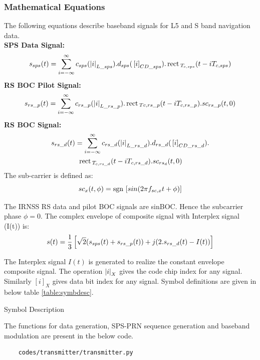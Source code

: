 \subsubsection{Mathematical Equations}
The following equations describe baseband signals for L5 and S band navigation data.
\\
\textbf{SPS Data Signal:}
\begin{equation}
	s_{sps}(t) = \sum_{i=-\infty}^{\infty} c_{sps}(\left\vert i\right\vert_{L\_sps}) . d_{sps}({}\left[i\right]_{CD\_sps}) . \,\text{rect}\,_{T_{c,sps}}(t-iT_{c,sps})
\end{equation}
\textbf{RS BOC Pilot Signal:}
\begin{equation}
	s_{rs\_p}(t) = \sum_{i=-\infty}^{\infty} c_{rs\_p}(\left\vert i\right\vert_{L\_rs\_p}) . \,\text{rect}\,_{Tc,rs\_p}(t-iT_{c,rs\_p}). sc_{rs\_p}(t,0)
\end{equation}
\textbf{RS BOC Signal:}
\begin{multline}
	s_{rs\_d}(t) = \sum_{i=-\infty}^{\infty} c_{rs\_d}(\left\vert i\right\vert_{L\_rs\_d}) . d_{rs\_d}({}\left[i\right]_{CD\_rs\_d}).  \\ 
	                       \,\text{rect}\,_{T_{c,rs\_d}}(t-iT_{c,rs\_d}). sc_{rs_d}(t,0)
\end{multline}
The sub-carrier is defined as:
\begin{equation}
	sc_x(t,\phi) = \mathop{\mathrm{sgn}}{}\left[sin(2 \pi f_{sc,x}t + \phi)\right]
\end{equation}

\noindent The IRNSS RS data and pilot BOC signals are sinBOC. Hence the subcarrier phase $\phi=0$.
The complex envelope of composite signal with Interplex signal (I(t)) is:
\begin{equation}
s(t) = \dfrac{1}{3} {}\left[\sqrt{2} (s_{sps}(t) + s_{rs\_p}(t)) + j(2. s_{rs\_d}(t) - I(t))\right] 
\end{equation}

\noindent The Interplex signal $I(t)$ is generated to realize the constant envelope composite signal. The operation $\left\vert i\right\vert_X$ gives the code chip index for any signal. Similarly $[i]_X$ gives data bit index for any signal.
Symbol definitions are given in below table \ref{table:symbdesc}.

\begin{table}[h]

\vspace{3mm}
\caption{Symbol Description}
\label{table:symbdesc}
\end{table}

The functions for data generation, SPS-PRN sequence generation and baseband modulation are present in the below code.
\begin{lstlisting}
    codes/transmitter/transmitter.py
\end{lstlisting}
\let\cleardoublepage\clearpage
